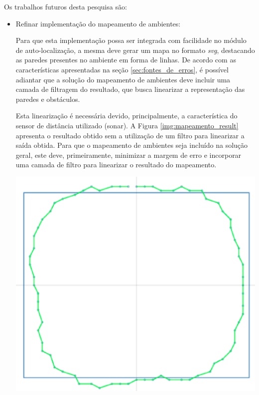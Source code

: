 Os trabalhos futuros desta pesquisa são:

\begin{itemize}
  \item Refinar implementação do mapeamento de ambientes:

    Para que esta implementação possa ser integrada com facilidade no módulo de auto-localização, a mesma deve gerar um mapa
    no formato \textit{svg}, destacando as paredes presentes no ambiente em forma de linhas. De acordo com as características
    apresentadas na seção \ref{sec:fontes_de_erros}, é possível adiantar que a solução do mapeamento de ambientes deve incluir uma
    camada de filtragem do resultado, que busca linearizar a representação das paredes e obstáculos.

    Esta linearização é necessária devido, principalmente, a característica do sensor de distância utilizado (sonar). A Figura \ref{img:mapeamento_result}
    apresenta o resultado obtido sem a utilização de um filtro para linearizar a saída obtida. Para que o mapeamento de ambientes seja
    incluído na solução geral, este deve, primeiramente, minimizar a margem de erro e incorporar uma camada de filtro para linearizar
    o resultado do mapeamento.

    {\centering
    \includegraphics[scale=0.7]{figuras/mapeamento_result.eps}
    \label{img:mapeamento_result}
    \par}


\end{itemize}
